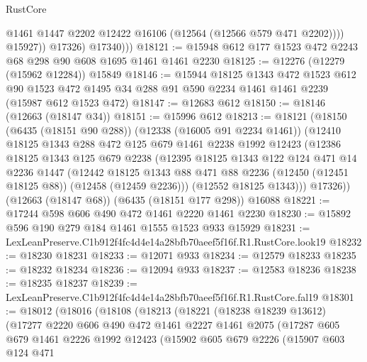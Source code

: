 \begin{lexlean}{RustCore}
\begin{coremodule}
                    @1461
                    @1447
                    @2202
                    @12422
                    @16106
                    (@12564 (@12566 @579 @471 @2202))))
                @15927))
            @17326)
          @17340)))
@18121 := @15948 @612 @177 @1523 @472 @2243 @68 @298 @90 @608 @1695 @1461 @1461 @2230
@18125 := @12276 (@12279 (@15962 @12284)) @15849
@18146 := @15944
    @18125
    @1343
    @472
    @1523
    @612
    @90
    @1523
    @472
    @1495
    @34
    @288
    @91
    @590
    @2234
    @1461
    @1461
    @2239
    (@15987 @612 @1523 @472)
@18147 := @12683 @612
@18150 := @18146 (@12663 (@18147 @34))
@18151 := @15996 @612
@18213 := @18121
    (@18150
      (@6435 (@18151 @90 @288))
      (@12338 (@16005 @91 @2234 @1461))
      (@12410
        @18125
        @1343
        @288
        @472
        @125
        @679
        @1461
        @2238
        @1992
        @12423
        (@12386
          @18125
          @1343
          @125
          @679
          @2238
          (@12395
            @18125
            @1343
            @122
            @124
            @471
            @14
            @2236
            @1447
            (@12442
              @18125
              @1343
              @88
              @471
              @88
              @2236
              (@12450 (@12451 @18125 @88))
              (@12458 (@12459 @2236)))
            (@12552 @18125 @1343)))
        @17326))
    (@12663 (@18147 @68))
    (@6435 (@18151 @177 @298))
    @16088
@18221 := @17244 @598 @606 @490 @472 @1461 @2220 @1461 @2230
@18230 := @15892 @596 @190 @279 @184 @1461 @1555 @1523 @933 @15929
@18231 := LexLeanPreserve.C1b912f4fc4d4e14a28bfb70aeef5f16f.R1.RustCore.look19
@18232 := @18230 @18231
@18233 := @12071 @933
@18234 := @12579 @18233
@18235 := @18232 @18234
@18236 := @12094 @933
@18237 := @12583 @18236
@18238 := @18235 @18237
@18239 := LexLeanPreserve.C1b912f4fc4d4e14a28bfb70aeef5f16f.R1.RustCore.fal19
@18301 := @18012
    (@18016
      (@18108
        (@18213
          (@18221
            (@18238 @18239 @13612)
            (@17277
              @2220
              @606
              @490
              @472
              @1461
              @2227
              @1461
              @2075
              (@17287
                @605
                @679
                @1461
                @2226
                @1992
                @12423
                (@15902
                  @605
                  @679
                  @2226
                  (@15907
                    @603
                    @124
                    @471

\end{coremodule}
\end{lexlean}
